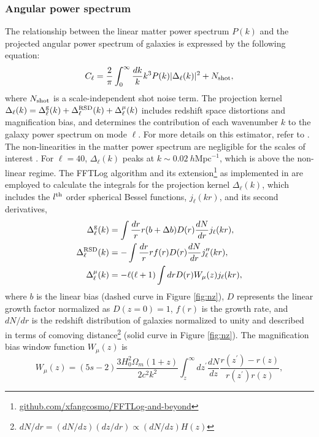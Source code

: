 \subsubsection{Angular power spectrum} 
The relationship between the linear matter power spectrum $P(k)$ and the projected angular power spectrum of galaxies is expressed by the following equation:
\begin{equation}\label{eq:cell}
C_{\ell} = \frac{2}{\pi}\int_{0}^{\infty}\frac{dk}{k}k^{3}P(k)|\Delta_{\ell}(k)|^{2} + N_{\rm shot},
\end{equation}
where $N_{\rm shot}$ is a scale-independent shot noise term. The projection kernel $\Delta_{\ell}(k) = \Delta^{\rm g}_{\ell}(k) + \Delta^{\rm RSD}_{\ell}(k) + \Delta^{\mu}_{\ell}(k)$ includes redshift space distortions and magnification bias, and determines the contribution of each wavenumber $k$ to the galaxy power spectrum on mode $\ell$. For more details on this estimator, refer to \cite{Padmanabhan2007}. The non-linearities in the matter power spectrum are negligible for the scales of interest \citep[see, e.g.,][]{Ho2015JCAP...05..040H}. For $\ell=40$, $\Delta_{\ell}(k)$ peaks at $k\sim 0.02~ h\text{Mpc}^{-1}$, which is above the non-linear regime. The FFTLog algorithm and its extension\footnote{\href{https://github.com/xfangcosmo/FFTLog-and-beyond}{github.com/xfangcosmo/FFTLog-and-beyond}} as implemented in \cite{fang2020beyond} are employed to calculate the integrals for the projection kernel $\Delta_{\ell}(k)$, which includes the $l^{\rm th}$ order spherical Bessel functions, $ j_{\ell}(kr)$, and its second derivatives,
\begin{align}
    \Delta^{\rm g}_{\ell}(k) &= \int \frac{dr}{r} r (b+\Delta b) D(r) \frac{dN}{dr} j_{\ell}(kr),\\
    \Delta^{\rm RSD}_{\ell}(k) &= - \int \frac{dr}{r} r f(r) D(r) \frac{dN}{dr} j^{\prime\prime}_{\ell}(kr),\\
    \Delta^{\mu}_{\ell}(k) &= - \ell(\ell+1) \int dr D(r) W_{\mu}(z) j_{\ell}(kr),
\end{align}
where $b$ is the linear bias (dashed curve in Figure \ref{fig:nz}), $D$ represents the linear growth factor normalized as $D(z=0)=1$, $f(r)$ is the growth rate, and $dN/dr$ is the redshift distribution of galaxies normalized to unity and described in terms of comoving distance\footnote{$dN/dr = (dN/dz)(dz/dr) \propto (dN/dz)H(z)$} (solid curve in Figure \ref{fig:nz}). The magnification bias window function $W_{\mu}(z)$ is
\begin{equation}
W_{\mu}(z) = (5s-2)\frac{3H^{2}_{0}\Omega_{m}(1+z)}{2c^{2}k^{2}} \int_{z}^{\infty} dz^{\prime}\frac{dN}{dz} \frac{r(z^{\prime}) - r(z)}{r(z^{\prime})r(z)},
\end{equation}

